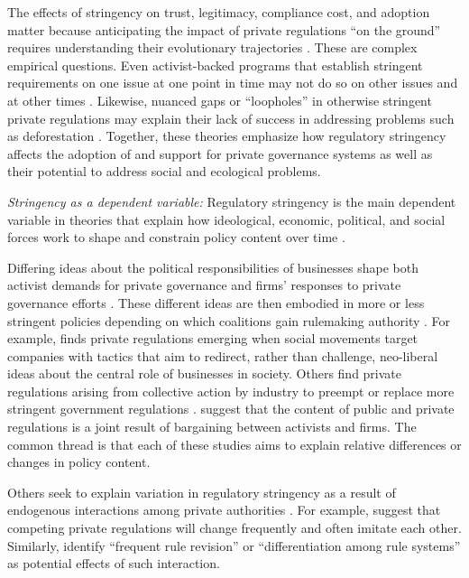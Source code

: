 \documentclass[
      12pt,
            Review ]{article}
\begin{document}
The effects of stringency on trust, legitimacy, compliance cost, and adoption matter because anticipating the impact of private regulations ``on the ground'' requires understanding their evolutionary trajectories \citep{VanderVen2018}. These are complex empirical questions. Even activist-backed programs that establish stringent requirements on one issue at one point in time may not do so on other issues and at other times \citep{LeBaron2018}. Likewise, nuanced gaps or ``loopholes'' in otherwise stringent private regulations may explain their lack of success in addressing problems such as deforestation \citep{VanderVen2018}. Together, these theories emphasize how regulatory stringency affects the adoption of and support for private governance systems as well as their potential to address social and ecological problems.

\emph{Stringency as a dependent variable:} Regulatory stringency is the main dependent variable in theories that explain how ideological, economic, political, and social forces work to shape and constrain policy content over time \citep{Bartley2003, Cashore2004, Fischer2014}.

Differing ideas about the political responsibilities of businesses shape both activist demands for private governance and firms' responses to private governance efforts \citep{Bartley2003, Djelic2017}. These different ideas are then embodied in more or less stringent policies depending on which coalitions gain rulemaking authority \citep{Botzem2012, Hsueh2012}. For example, \citet{Bartley2003} finds private regulations emerging when social movements target companies with tactics that aim to redirect, rather than challenge, neo-liberal ideas about the central role of businesses in society. Others find private regulations arising from collective action by industry to preempt or replace more stringent government regulations \citep{Bartley2007, Cashore2002, Grabosky2013, Green2013, Loconto2014, Lyon2008, Maxwell2000, Prakash2000}. \citet{Abbott2009} suggest that the content of public and private regulations is a joint result of bargaining between activists and firms. The common thread is that each of these studies aims to explain relative differences or changes in policy content.

Others seek to explain variation in regulatory stringency as a result of endogenous interactions among private authorities \citep{DeLeon2009, Eberlein2014, Green2017, Gulbrandsen2014, Howard-Grenville2008, Li2015, Mills2016d}. For example, \citet{Smith2010} suggest that competing private regulations will change frequently and often imitate each other. Similarly, \citet{Eberlein2014} identify ``frequent rule revision'' or ``differentiation among rule systems'' as potential effects of such interaction.
\end{document}
